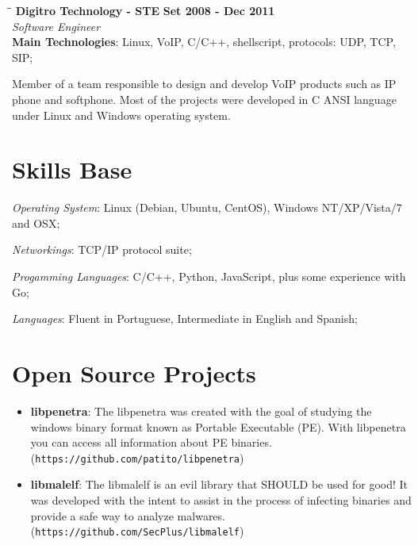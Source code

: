 \documentclass[margin]{res}
\begin{document}
\begin{resume}
\vspace{-0.1in}   
   \begin{tabbing}
   \hspace{2.3in}\= \hspace{1.7in}\= \kill %
    \textbf{Digitro Technology - STE}    \>\>\textbf{Set 2008 - Dec 2011}\\
    \textit{Software Engineer}\\   
    \textbf{Main Technologies}: Linux, VoIP, C/C++, shellscript, protocols: UDP, TCP, SIP;
   \end{tabbing}\vspace{-20pt}      %
    \vspace{2mm}
    
    Member of a team responsible to design and develop VoIP products such as IP phone and 
    softphone. Most of the projects were developed in C ANSI language under Linux and Windows
    operating system.    

\section{Skills Base}

      \textit{Operating System}:  Linux (Debian, Ubuntu, CentOS), Windows NT/XP/Vista/7 and OSX;

			\textit{Networkings}: TCP/IP protocol suite;
  
			\textit{Progamming Languages}: C/C++, Python, JavaScript, plus some experience with Go;


			\textit{Languages}: Fluent in Portuguese, Intermediate in English and Spanish;
 
\section{Open Source Projects}
		\begin{itemize}
		    \vspace{2mm}
		    \item \textbf{libpenetra}: The libpenetra was created with the goal of studying the windows binary format known as Portable Executable (PE). With libpenetra you can access all information about PE binaries. (\texttt{https://github.com/patito/libpenetra}) \vspace{1mm}
		                               
		    \item \textbf{libmalelf}: The libmalelf is an evil library that SHOULD be used for good! It was developed with the intent to assist in the process of infecting binaries and provide a safe way to analyze malwares. (\texttt{https://github.com/SecPlus/libmalelf})\vspace{1mm}
		                              

\end{itemize}
\end{resume}
\end{document}
